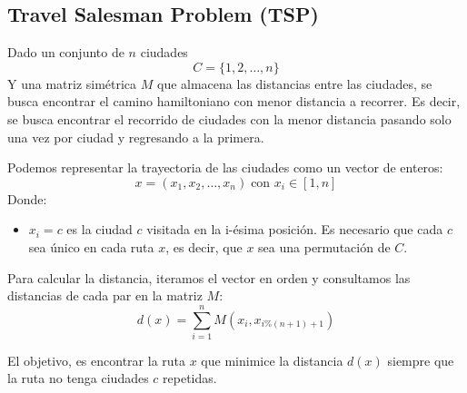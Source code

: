 \documentclass[12pt,twoside]{article}
\begin{document}
	\subsection{Travel Salesman Problem (TSP)}
	
	Dado un conjunto de $n$ ciudades \[ C = \{1,2, \dots , n\} \] Y una matriz simétrica $M$ que almacena las distancias entre las ciudades, se busca encontrar el camino hamiltoniano con menor distancia a recorrer. Es decir, se busca encontrar el recorrido de ciudades con la menor distancia pasando solo una vez por ciudad y regresando a la primera.
	
	Podemos representar la trayectoria de las ciudades como un vector de enteros:
	\[ x = (x_1, x_2, \dots, x_n) \; \text{con } x_i \in [1, n] \]
	Donde:
	\begin{itemize}
		\item $x_i = c$ es la ciudad $c$ visitada en la i-ésima posición. Es necesario que cada $c$ sea único en cada ruta $x$, es decir, que $x$ sea una permutación de $C$.
	\end{itemize}
	
	Para calcular la distancia, iteramos el vector en orden y consultamos las distancias de cada par en la matriz $M$: 
	\[ d(x) = \sum_{i = 1}^{n} M(x_i, x_{i \%(n+1)+ 1}) \]
	
	El objetivo, es encontrar la ruta $x$ que minimice la distancia $d(x)$ siempre que la ruta no tenga ciudades $c$ repetidas.
	
\end{document}
